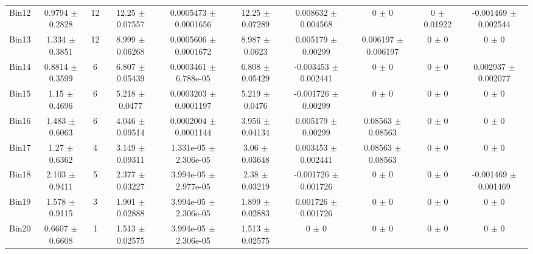 \begin{tabular}{@{\extracolsep{4pt}}lccccccccc@{}}
     Bin12 & 0.9794 $\pm$ 0.2828 & 12 & 12.25 $\pm$ 0.07557 & 0.0005473 $\pm$ 0.0001656 & 12.25 $\pm$ 0.07289 & 0.008632 $\pm$ 0.004568 & 0 $\pm$ 0 & 0 $\pm$ 0.01922 & -0.001469 $\pm$ 0.002544 \\ 
     Bin13 & 1.334 $\pm$ 0.3851 & 12 & 8.999 $\pm$ 0.06268 & 0.0005606 $\pm$ 0.0001672 & 8.987 $\pm$ 0.0623 & 0.005179 $\pm$ 0.00299 & 0.006197 $\pm$ 0.006197 & 0 $\pm$ 0 & 0 $\pm$ 0 \\ 
     Bin14 & 0.8814 $\pm$ 0.3599 & 6 & 6.807 $\pm$ 0.05439 & 0.0003461 $\pm$ 6.788e-05 & 6.808 $\pm$ 0.05429 & -0.003453 $\pm$ 0.002441 & 0 $\pm$ 0 & 0 $\pm$ 0 & 0.002937 $\pm$ 0.002077 \\ 
     Bin15 & 1.15 $\pm$ 0.4696 & 6 & 5.218 $\pm$ 0.0477 & 0.0003203 $\pm$ 0.0001197 & 5.219 $\pm$ 0.0476 & -0.001726 $\pm$ 0.00299 & 0 $\pm$ 0 & 0 $\pm$ 0 & 0 $\pm$ 0 \\ 
     Bin16 & 1.483 $\pm$ 0.6063 & 6 & 4.046 $\pm$ 0.09514 & 0.0002004 $\pm$ 0.0001144 & 3.956 $\pm$ 0.04134 & 0.005179 $\pm$ 0.00299 & 0.08563 $\pm$ 0.08563 & 0 $\pm$ 0 & 0 $\pm$ 0 \\ 
     Bin17 & 1.27 $\pm$ 0.6362 & 4 & 3.149 $\pm$ 0.09311 & 1.331e-05 $\pm$ 2.306e-05 & 3.06 $\pm$ 0.03648 & 0.003453 $\pm$ 0.002441 & 0.08563 $\pm$ 0.08563 & 0 $\pm$ 0 & 0 $\pm$ 0 \\ 
     Bin18 & 2.103 $\pm$ 0.9411 & 5 & 2.377 $\pm$ 0.03227 & 3.994e-05 $\pm$ 2.977e-05 & 2.38 $\pm$ 0.03219 & -0.001726 $\pm$ 0.001726 & 0 $\pm$ 0 & 0 $\pm$ 0 & -0.001469 $\pm$ 0.001469 \\ 
     Bin19 & 1.578 $\pm$ 0.9115 & 3 & 1.901 $\pm$ 0.02888 & 3.994e-05 $\pm$ 2.306e-05 & 1.899 $\pm$ 0.02883 & 0.001726 $\pm$ 0.001726 & 0 $\pm$ 0 & 0 $\pm$ 0 & 0 $\pm$ 0 \\ 
     Bin20 & 0.6607 $\pm$ 0.6608 & 1 & 1.513 $\pm$ 0.02575 & 3.994e-05 $\pm$ 2.306e-05 & 1.513 $\pm$ 0.02575 & 0 $\pm$ 0 & 0 $\pm$ 0 & 0 $\pm$ 0 & 0 $\pm$ 0 \\ 
\hline\hline
  \end{tabular}
